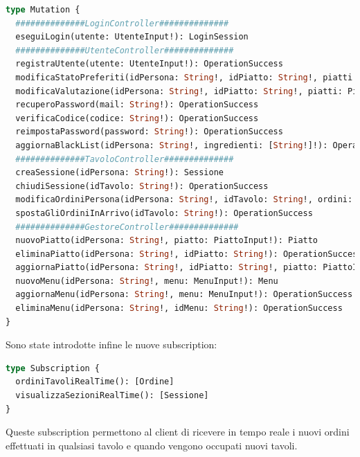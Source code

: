 \begin{lstlisting}[language=GraphQL, title={schema.graphqls}]
type Mutation {
  ##############LoginController##############
  eseguiLogin(utente: UtenteInput!): LoginSession
  ##############UtenteController##############
  registraUtente(utente: UtenteInput!): OperationSuccess
  modificaStatoPreferiti(idPersona: String!, idPiatto: String!, piatti: [PiattoInput!]!): OperationSuccess
  modificaValutazione(idPersona: String!, idPiatto: String!, piatti: PiattoPreferito!): OperationSuccess
  recuperoPassword(mail: String!): OperationSuccess
  verificaCodice(codice: String!): OperationSuccess
  reimpostaPassword(password: String!): OperationSuccess
  aggiornaBlackList(idPersona: String!, ingredienti: [String!]!): OperationSuccess
  ##############TavoloController##############
  creaSessione(idPersona: String!): Sessione
  chiudiSessione(idTavolo: String!): OperationSuccess
  modificaOrdiniPersona(idPersona: String!, idTavolo: String!, ordini: [OrdineInput!]!): OperationSuccess
  spostaGliOrdiniInArrivo(idTavolo: String!): OperationSuccess
  ##############GestoreController##############
  nuovoPiatto(idPersona: String!, piatto: PiattoInput!): Piatto
  eliminaPiatto(idPersona: String!, idPiatto: String!): OperationSuccess
  aggiornaPiatto(idPersona: String!, idPiatto: String!, piatto: PiattoInput!): OperationSuccess
  nuovoMenu(idPersona: String!, menu: MenuInput!): Menu
  aggiornaMenu(idPersona: String!, menu: MenuInput!): OperationSuccess
  eliminaMenu(idPersona: String!, idMenu: String!): OperationSuccess
}
\end{lstlisting}
Sono state introdotte infine le nuove subscription:
\begin{lstlisting}[language=GraphQL, title={schema.graphqls}]
type Subscription {
  ordiniTavoliRealTime(): [Ordine]
  visualizzaSezioniRealTime(): [Sessione]
}
\end{lstlisting}
Queste subscription permettono al client di ricevere in tempo reale i nuovi ordini effettuati in qualsiasi tavolo e quando vengono occupati nuovi tavoli.
